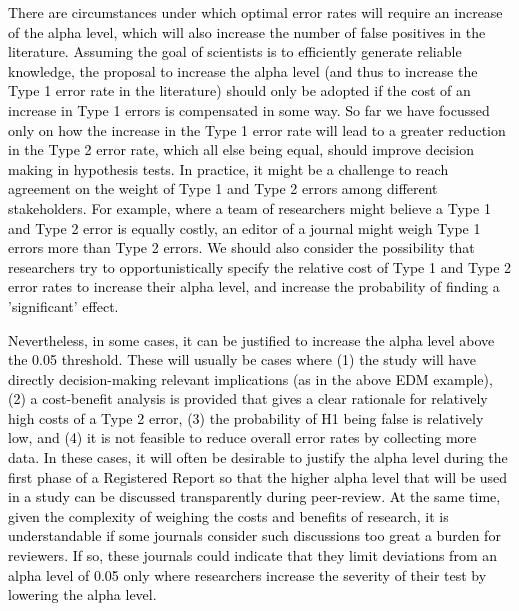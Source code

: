 \documentclass[
  english,
  ,man, a4paper,floatsintext]{apa6}
\begin{document}
\textcolor{black}{There are circumstances under which optimal error rates will require an increase of the alpha level, which will also increase the number of false positives in the literature. Assuming the goal of scientists is to efficiently generate reliable knowledge, the proposal to increase the alpha level (and thus to increase the Type 1 error rate in the literature) should only be adopted if the cost of an increase in Type 1 errors is compensated in some way. So far we have focussed only on how the increase in the Type 1 error rate will lead to a greater reduction in the Type 2 error rate, which all else being equal, should improve decision making in hypothesis tests. In practice, it might be a challenge to reach agreement on the weight of Type 1 and Type 2 errors among different stakeholders. For example, where a team of researchers might believe a Type 1 and Type 2 error is equally costly, an editor of a journal might weigh Type 1 errors more than Type 2 errors. We should also consider the possibility that researchers try to opportunistically specify the relative cost of Type 1 and Type 2 error rates to increase their alpha level, and increase the probability of finding a 'significant' effect.}

\textcolor{black}{Nevertheless, in some cases, it can be justified to increase the alpha level above the 0.05 threshold. These will usually be cases where (1) the study will have directly decision-making relevant implications (as in the above EDM example), (2) a cost-benefit analysis is provided that gives a clear rationale for relatively high costs of a Type 2 error, (3) the probability of H1 being false is relatively low, and (4) it is not feasible to reduce overall error rates by collecting more data. In these cases, it will often be desirable to justify the alpha level during the first phase of a Registered Report so that the higher alpha level that will be used in a study can be discussed transparently during peer-review. At the same time, given the complexity of weighing the costs and benefits of research, it is understandable if some journals consider such discussions too great a burden for reviewers. If so, these journals could indicate that they limit deviations from an alpha level of 0.05 only where researchers increase the severity of their test by lowering the alpha level.}
\end{document}

